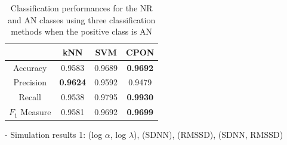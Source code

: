 \documentclass[times,twocolumn,final,authoryear]{elsarticle}
\begin{document}
\begin{table}[!t]
\caption{Classification performances for the NR and AN classes using three classification methods when the positive class is AN} \label{T3}
\begin{center}
\begin{tabular}{|c|c|c|c|}\hline\hline
                      & kNN     & SVM   & CPON \\ \hline\hline
Accuracy         & 0.9583  & 0.9689  & {\bf 0.9692} \\ \hline
Precision         & {\bf 0.9624}  & 0.9592  & 0.9479 \\ \hline
Recall             & 0.9538  & 0.9795 & {\bf 0.9930} \\ \hline
$F_1$ Measure & 0.9581  & 0.9692 & {\bf 0.9699} \\ \hline
\end{tabular}
\end{center}
\end{table}
\fi

\vspace{1em}

- Simulation results 1: (log $\alpha$, log $\lambda$), (SDNN), (RMSSD), (SDNN, RMSSD)
\end{document}
